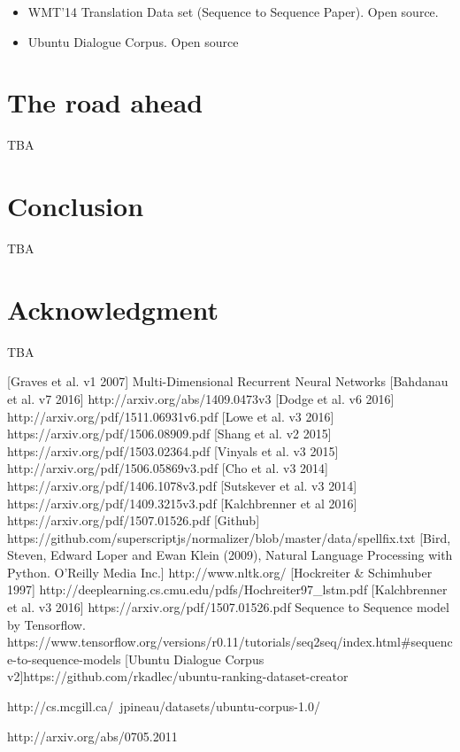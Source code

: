 \documentclass{article} %
\begin{document}
\begin{itemize}
    \item WMT'14 Translation Data set (Sequence to Sequence Paper). Open source.
    \item Ubuntu Dialogue Corpus. Open source
\end{itemize}

\section{The road ahead}
TBA

\section{Conclusion}
TBA
\section{Acknowledgment}
TBA
\begin{thebibliography}{1}
[Graves et al. v1 2007] Multi-Dimensional Recurrent Neural Networks
[Bahdanau et al. v7 2016] http://arxiv.org/abs/1409.0473v3
[Dodge et al. v6 2016] http://arxiv.org/pdf/1511.06931v6.pdf
[Lowe et al. v3 2016] https://arxiv.org/pdf/1506.08909.pdf
[Shang et al. v2 2015] https://arxiv.org/pdf/1503.02364.pdf
[Vinyals et al. v3 2015] http://arxiv.org/pdf/1506.05869v3.pdf
[Cho et al. v3 2014] https://arxiv.org/pdf/1406.1078v3.pdf
[Sutskever et al. v3 2014] https://arxiv.org/pdf/1409.3215v3.pdf
[Kalchbrenner et al 2016] https://arxiv.org/pdf/1507.01526.pdf
[Github] https://github.com/superscriptjs/normalizer/blob/master/data/spellfix.txt
[Bird, Steven, Edward Loper and Ewan Klein (2009), Natural Language Processing with Python. O’Reilly Media Inc.] http://www.nltk.org/
[Hockreiter \& Schimhuber 1997] http://deeplearning.cs.cmu.edu/pdfs/Hochreiter97\_lstm.pdf
[Kalchbrenner et al. v3 2016] https://arxiv.org/pdf/1507.01526.pdf
Sequence to Sequence model by Tensorflow. https://www.tensorflow.org/versions/r0.11/tutorials/seq2seq/index.html\#sequence-to-sequence-models
[Ubuntu Dialogue Corpus v2]https://github.com/rkadlec/ubuntu-ranking-dataset-creator

http://cs.mcgill.ca/~jpineau/datasets/ubuntu-corpus-1.0/
\end{thebibliography} http://arxiv.org/abs/0705.2011
\end{document}
